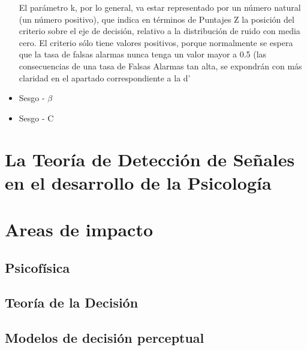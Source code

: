 \begin{itemize}
 El parámetro k, por lo general, va estar representado por un número natural (un número positivo), que indica en términos de Puntajes Z  la posición del criterio sobre el eje de decisión, relativo a la distribución de ruido con media cero. El criterio sólo tiene valores positivos, porque normalmente se espera que la tasa de falsas alarmas nunca tenga un valor mayor a 0.5 (las consecuencias de una tasa de Falsas Alarmas tan alta, se expondrán con más claridad en el apartado correspondiente a la d’


\item Sesgo - $\beta$


\item Sesgo - C


\end{itemize}


\section{La Teoría de Detección de Señales en el desarrollo de la Psicología}



\section{Areas de impacto}

\subsection{Psicofísica}

\subsection{Teoría de la Decisión}

\subsection{Modelos de decisión perceptual}

